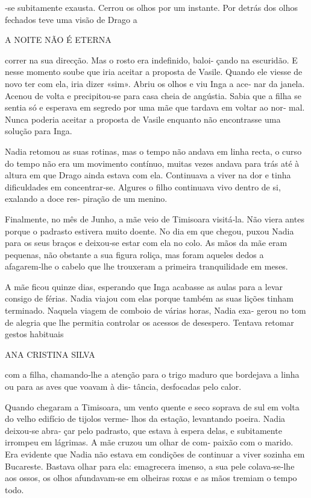 ‑se subitamente exausta. Cerrou os olhos por um instante. Por detrás dos
olhos fechados teve uma visão de Drago a

A NOITE NÃO É ETERNA

correr na sua direcção. Mas o rosto era indefinido, baloi‑ çando na
escuridão. E nesse momento soube que iria aceitar a proposta de Vasile.
Quando ele viesse de novo ter com ela, iria dizer «sim». Abriu os olhos
e viu Inga a ace‑ nar da janela. Acenou de volta e precipitou‑se para
casa cheia de angústia. Sabia que a filha se sentia só e esperava em
segredo por uma mãe que tardava em voltar ao nor‑ mal. Nunca poderia
aceitar a proposta de Vasile enquanto não encontrasse uma solução para
Inga.

Nadia retomou as suas rotinas, mas o tempo não andava em linha recta, o
curso do tempo não era um movimento contínuo, muitas vezes andava para
trás até à altura em que Drago ainda estava com ela. Continuava a viver
na dor e tinha dificuldades em concentrar‑se. Algures o filho continuava
vivo dentro de si, exalando a doce res‑ piração de um menino.

Finalmente, no mês de Junho, a mãe veio de Timisoara visitá‑la. Não
viera antes porque o padrasto estivera muito doente. No dia em que
chegou, puxou Nadia para os seus braços e deixou‑se estar com ela no
colo. As mãos da mãe eram pequenas, não obstante a sua figura roliça,
mas foram aqueles dedos a afagarem‑lhe o cabelo que lhe trouxeram a
primeira tranquilidade em meses.

A mãe ficou quinze dias, esperando que Inga acabasse as aulas para a
levar consigo de férias. Nadia viajou com elas porque também as suas
lições tinham terminado. Naquela viagem de comboio de várias horas,
Nadia exa‑ gerou no tom de alegria que lhe permitia controlar os acessos
de desespero. Tentava retomar gestos habituais

ANA CRISTINA SILVA

com a filha, chamando‑lhe a atenção para o trigo maduro que bordejava a
linha ou para as aves que voavam à dis‑ tância, desfocadas pelo calor.

Quando chegaram a Timisoara, um vento quente e seco soprava de sul em
volta do velho edifício de tijolos verme‑ lhos da estação, levantando
poeira. Nadia deixou‑se abra‑ çar pelo padrasto, que estava à espera
delas, e subitamente irrompeu em lágrimas. A mãe cruzou um olhar de com‑
paixão com o marido. Era evidente que Nadia não estava em condições de
continuar a viver sozinha em Bucareste. Bastava olhar para ela:
emagrecera imenso, a sua pele colava‑se‑lhe aos ossos, os olhos
afundavam‑se em olheiras roxas e as mãos tremiam o tempo todo.


